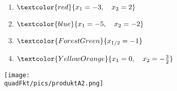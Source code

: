 \begin{Answer}[ref=produktformNullstellenA2]
	
	\begin{minipage}{\textwidth}
		\begin{minipage}{0.5\textwidth}
			\begin{enumerate}[label=\alph*)]
				\item \(\textcolor{red}{x_1=-3,\quad x_2=2}\)
				\item \(\textcolor{blue}{x_1=-5,\quad x_2=-2}\)
			\end{enumerate}
		\end{minipage}%
		\begin{minipage}{0.5\textwidth}
			\begin{enumerate}[label=\alph*)]
				\setcounter{enumi}{2}
				\item \(\textcolor{ForestGreen}{x_{1/2}=-1}\)
				\item \(\textcolor{YellowOrange}{x_1=0,\quad x_2=-\frac{3}{2}}\)
			\end{enumerate}
		\end{minipage}%
	\end{minipage}%
	
	\bigskip
	
	\texttt{[image: \\quadFkt/pics/produktA2.png]}
\end{Answer}